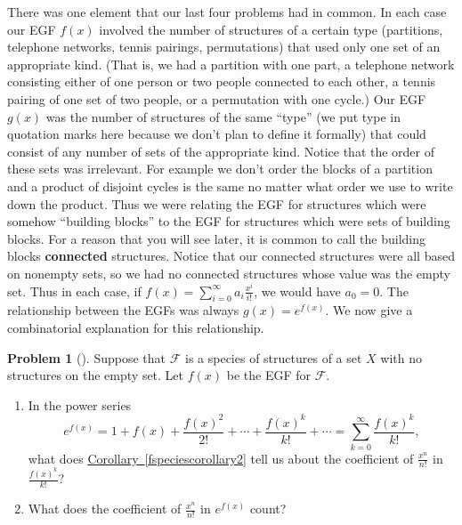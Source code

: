 \documentclass[10pt,]{book}
\newcommand{\terminology}[1]{\textbf{#1}}
\theoremstyle{plain}
\theoremstyle{definition}
\newtheorem{activity}[project]{Problem}
\theoremstyle{definition}
\numberwithin{equation}{chapter}
\newcommand{\F}{\mathcal{F}}
\begin{document}
There was one element that our last four problems had in common. In each case our EGF \(f(x)\) involved the number of structures of a certain type (partitions, telephone networks, tennis pairings, permutations) that used only one set of an appropriate kind. (That is, we had a partition with one part, a telephone network consisting either of one person or two people connected to each other, a tennis pairing of one set of two people, or a permutation with one cycle.) Our EGF \(g(x)\) was the number of structures of the same ``type'' (we put type in quotation marks here because we don't plan to define it formally) that could consist of any number of sets of the appropriate kind. Notice that the order of these sets was irrelevant. For example we don't order the blocks of a partition and a product of disjoint cycles is the same no matter what order we use to write down the product. Thus we were relating the EGF for structures which were somehow ``building blocks'' to the EGF for structures which were sets of building blocks. For a reason that you will see later, it is common to call the building blocks \terminology{connected} structures. Notice that our connected structures were all based on nonempty sets, so we had no connected structures whose value was the empty set. Thus in each case, if \(f(x) = \sum_{i=0}^\infty a_i\frac{x^i}{i!}\), we would have \(a_0=0\). The relationship between the EGFs was always \(g(x) = e^{f(x)}\). We now give a combinatorial explanation for this relationship.%
\begin{activity}[] \label{exponentialformula}
Suppose that \(\F\) is a species of structures of a set \(X\) with no structures on the empty set.  Let \(f(x)\) be the EGF for \(\F\).%
\begin{enumerate}[font=\bfseries,label=(\alph*),ref=\alph*]
\item\label{task-266} \marginsymbol[-2.5em]{} In the power series%
\begin{equation*}
e^{f(x)} = 1 + f(x) + \frac{f(x)^2}{2!} +
\cdots + \frac{f(x)^k}{k!} + \cdots= \sum_{k=0}^\infty \frac{f(x)^k}{k!},
\end{equation*}
what does \hyperref[fspeciescorollary2]{Corollary~\ref{fspeciescorollary2}} tell us about the coefficient of \(\frac{x^n}{n!}\) in \(\frac{f(x)^k}{k!}\)?%
\item\label{task-267} \marginsymbol[-2.5em]{} What does the coefficient of \(\frac{x^n}{n!}\) in \(e^{f(x)}\) count?%
\end{enumerate}
\end{activity}
\end{document}
